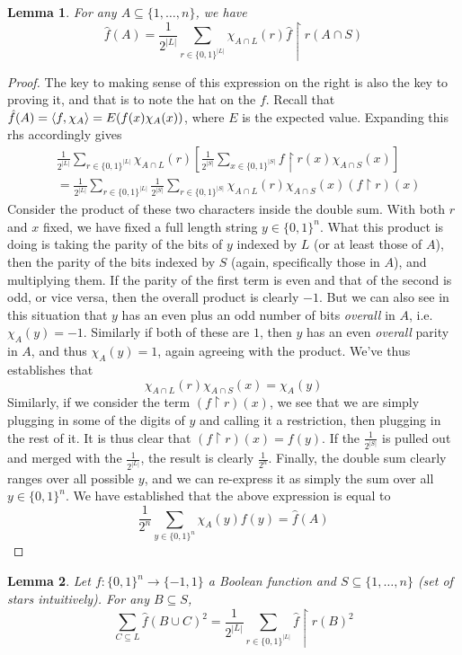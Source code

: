 \documentclass{article}
\theoremstyle{definition}
\theoremstyle{plain}
\theoremstyle{theorem}
\newtheorem{lemma}{Lemma}[section]
\begin{document}
\begin{lemma}
	For any $A \subseteq \{1,\ldots,n\}$, we have
	\[ \hat{f}(A) = \frac{1}{2^{|L|}} \sum_{r \in \{0,1\}^{|L|}}\chi_{A \cap L}(r)\hat{f} \restriction r(A \cap S) \]
\end{lemma}
\begin{proof}
	The key to making sense of this expression on the right is also the key to proving it, and that is to note the hat on the $f$. Recall that $\hat{f}(A) = \braket{f,\chi_A} = E(f(x)\chi_A(x))$, where $E$ is the expected value. Expanding this rhs accordingly gives
	\begin{align}
		& \frac{1}{2^{|L|}} \sum_{r \in \{0,1\}^{|L|}}\chi_{A \cap L}(r)\left[ \frac{1}{2^{|S|}} \sum_{x \in \{0,1\}^{|S|}} f \restriction r(x)\chi_{A \cap S}(x) \right] \\
		&= \frac{1}{2^{|L|}} \sum_{r \in \{0,1\}^{|L|}} \frac{1}{2^{|S|}} \sum_{r \in \{0,1\}^{|S|}} \chi_{A \cap L}(r)\chi_{A \cap S}(x)(f \restriction r)(x)
	\end{align}
	Consider the product of these two characters inside the double sum. With both $r$ and $x$ fixed, we have fixed a full length string $y \in \{0,1\}^n$. What this product is doing is taking the parity of the bits of $y$ indexed by $L$ (or at least those of $A$), then the parity of the bits indexed by $S$ (again, specifically those in $A$), and multiplying them. If the parity of the first term is even and that of the second is odd, or vice versa, then the overall product is clearly $-1$. But we can also see in this situation that $y$ has an even plus an odd number of bits \emph{overall} in $A$, i.e. $\chi_A(y) = -1$. Similarly if both of these are $1$, then $y$ has an even \emph{overall} parity in $A$, and thus $\chi_A(y) = 1$, again agreeing with the product. We've thus establishes that 
	\[ \chi_{A \cap L}(r)\chi_{A \cap S}(x) = \chi_A(y) \]
Similarly, if we consider the term $(f \restriction r)(x)$, we see that we are simply plugging in some of the digits of $y$ and calling it a restriction, then plugging in the rest of it. It is thus clear that $(f \restriction r)(x) = f(y)$. If the $\frac{1}{2^{|S|}}$ is pulled out and merged with the $\frac{1}{2^{|L|}}$, the result is clearly $\frac{1}{2^n}$. Finally, the double sum clearly ranges over all possible $y$, and we can re-express it as simply the sum over all $y \in \{0,1\}^n$. We have established that the above expression is equal to
\[ \frac{1}{2^n} \sum_{y \in \{0,1\}^{n}}  \chi_A(y)f(y) = \hat{f}(A) \]
\end{proof}
\begin{lemma}
	Let $f:\{0,1\}^n \to \{-1,1\}$ a Boolean function and $S \subseteq \{1,\ldots,n\}$ (set of stars intuitively). For any $B \subseteq S$, 
	\[ \sum_{C \subseteq L} \hat{f}(B \cup C)^2 = \frac{1}{2^{|L|}} \sum_{r \in \{0,1\}^{|L|}} \hat{f} \restriction r(B)^2  \]
\end{lemma}
\end{document}
